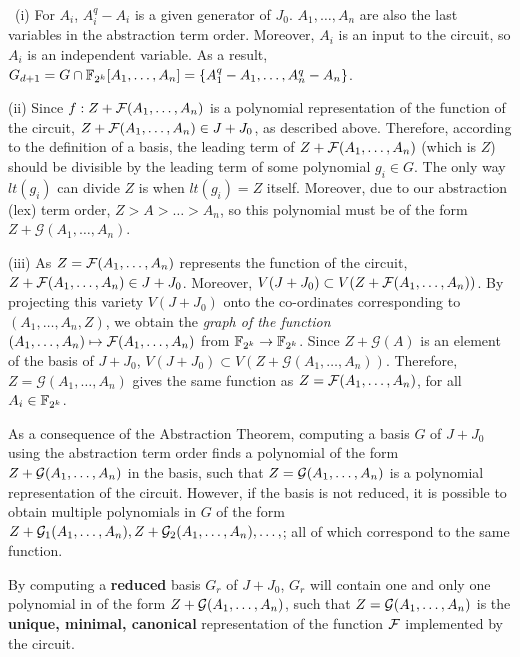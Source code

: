 \begin{Proof}\
(i) For $A_i$, $A_i^q-A_i$ is a given generator of $J_0$. 
  $A_1,\dots,A_n$ are also 
  the last variables in the abstraction term order. Moreover, $A_i$ is an
  input to the circuit, so $A_i$ is an independent variable. As a result, 
  $G_{d+1} = G \cap{\mathbb{F}}_{2^k}[A_1,\dots,A_n] = \{A_1^q - A_1,\dots,A_n^q-A_n\}$.

(ii) Since $f:Z + {\mathcal{F}}(A_1,\dots,A_n)$ is a polynomial representation of
  the function of the circuit, $Z + {\mathcal{F}}(A_1,\dots,A_n) \in J + J_0$, as
  described above. Therefore, according to the definition of a
  \Grobner basis, the leading term of $Z +
  {\mathcal{F}}(A_1,\dots,A_n)$ (which is $Z$) should be divisible by the leading
  term of some polynomial $g_i \in G$. The only way $lt(g_i)$ can
  divide $Z$ is when $lt(g_i) = Z$ itself. Moreover, due to our
  abstraction (lex) term order, $Z > A > \dots > A_n$, so this polynomial 
  must be of the form $Z + {\mathcal{G}}(A_1,\dots,A_n)$. 

(iii) As $Z = {\mathcal{F}}(A_1,\dots,A_n)$ represents the function of the circuit, 
  $Z + {\mathcal{F}}(A_1,\dots,A_n) \in J + J_0$. 
  Moreover, $V(J + J_0) \subset V(Z + {\mathcal{F}}(A_1,\dots,A_n))$. 
  By projecting this variety $V(J + J_0)$ onto the co-ordinates
  corresponding to $(A_1,\dots,A_n, Z)$, we obtain the {\it graph of the
  function} $(A_1,\dots,A_n) \mapsto {\mathcal{F}}(A_1,\dots,A_n)$ 
  from ${\mathbb{F}}_{2^k} \rightarrow {\mathbb{F}}_{2^k}$. Since $Z + {\mathcal{G}}(A)$ is an element 
  of the \Grobner basis of $J + J_0$, 
  $V(J + J_0) \subset V(Z + {\mathcal{G}}(A_1,\dots,A_n))$. Therefore,
  $Z = {\mathcal{G}}(A_1,\dots,A_n)$ gives the same function as 
  $Z = {\mathcal{F}}(A_1,\dots,A_n)$, for all $A_i \in {\mathbb{F}}_{2^k}$.
\end{Proof}

As a consequence of the Abstraction Theorem, computing a \Grobner
basis $G$ of $J + J_0$ using the abstraction term order finds
a polynomial of the form $Z + {\mathcal{G}}(A_1,\dots,A_n)$ in the \Grobner basis, 
such that $Z = {\mathcal{G}}(A_1,\dots,A_n)$ is a polynomial representation of the 
circuit. However, if the \Grobner basis is not reduced, it is possible to 
obtain multiple polynomials in $G$ of the form 
$Z + {\mathcal{G}} _1(A_1,\dots,A_n), Z + {\mathcal{G}} _2(A_1,\dots,A_n), \dots,$;
all of which correspond to the same function. 

\begin{Corollary}
By computing a {\bf reduced} \Grobner basis $G_r$ of $J + J_0$, 
$G_r$ will contain one and only one polynomial in of the form 
$Z + {\mathcal{G}}(A_1,\dots,A_n)$, such that $Z = {\mathcal{G}}(A_1,\dots,A_n)$ is the 
{\bf unique, minimal, canonical} representation of the function 
${\mathcal{F}}$ implemented by the circuit.  
\end{Corollary}

